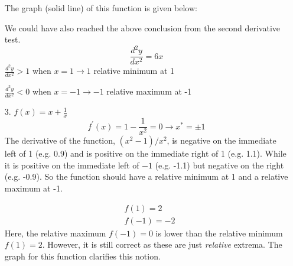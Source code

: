 \documentclass{./../../Latex/homework}
\begin{document}
\begin{enumerate}
The graph (solid line) of this function is given below:

\begin{center}
\end{center}

We could have also reached the above conclusion from the second derivative test.
$$
\frac{d^{2} y}{d x^{2}}=6 x
$$
$\frac{d^{2} y}{d x^{2}}>1$ when $x=1 \rightarrow 1$ relative minimum at 1

$\frac{d^{2} y}{d x^{2}}<0$ when $x=-1 \rightarrow-1$ relative maximum at -1

\newpage

\item[3.] $f(x)=x+\frac{1}{x}$
$$
f^{\prime}(x)=1-\frac{1}{x^{2}}=0 \rightarrow x^*=\pm 1
$$
The derivative of the function, $(x^2-1)/x^2$, is negative on the immediate left of 1 (e.g. $0.9$) and is positive on the immediate right of 1 (e.g. 1.1). While it is positive on the immediate left of $-1$ (e.g. -1.1) but negative on the right (e.g. -0.9). So the function should have a relative minimum at 1 and a relative maximum at -1.

$$
\begin{aligned}
& f(1)=2 \\
& f(-1)=-2
\end{aligned}
$$
Here, the relative maximum $f(-1)=0$ is lower than the relative minimum $f(1)=2$. However, it is still correct as these are just \textit{relative} extrema. The graph for this function clarifies this notion. \\

\begin{center}
\end{center}


\end{enumerate}
\end{document}
